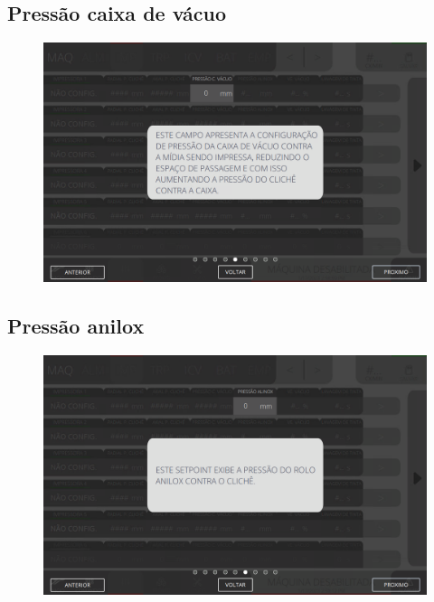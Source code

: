 \newpage
\thispagestyle{fancy}
\vspace*{40 pt}
\subsection{Pressão caixa de vácuo}
\vspace*{\fill}
\begin{figure}[h]
    \centering
    \includegraphics[width=576 px,height=360 px]{src/imagesICV/04-printters/01-printters/settings/5.png}
\end{figure}
\vspace*{\fill}

\newpage
\thispagestyle{fancy}
\vspace*{40 pt}
\subsection{Pressão anilox}
\vspace*{\fill}
\begin{figure}[h]
    \centering
    \includegraphics[width=576 px,height=360 px]{src/imagesICV/04-printters/01-printters/settings/6.png}
\end{figure}
\vspace*{\fill}

